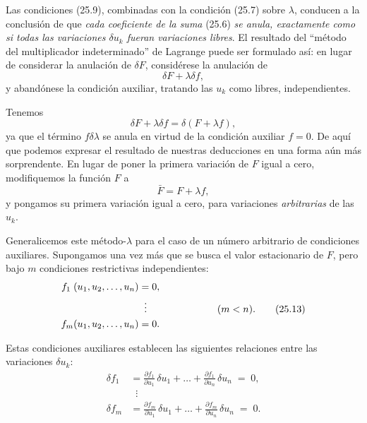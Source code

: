 \documentclass[12pt,a4paper]{book}
\begin{document}
Las condiciones (25.9), combinadas con la condición (25.7) sobre $\lambda$, conducen a la conclusión de que \textit{cada coeficiente de la suma} (25.6) \textit{se anula, exactamente como si todas las variaciones $\delta u_k$ fueran variaciones libres}. El resultado del ``método del multiplicador indeterminado'' de Lagrange puede ser formulado así: en lugar de considerar la anulación de $\delta F$, considérese la anulación de
\begin{equation}
\delta F + \lambda \delta f, \tag{25.10}
\end{equation}
y abandónese la condición auxiliar, tratando las $u_k$ como libres, independientes.

Tenemos
\begin{equation}
\delta F + \lambda \delta f = \delta(F + \lambda f), \tag{25.11}
\end{equation}
ya que el término $f\delta\lambda$ se anula en virtud de la condición auxiliar $f = 0$. De aquí que podemos expresar el resultado de nuestras deducciones en una forma aún más sorprendente. En lugar de poner la primera variación de $F$ igual a cero, modifiquemos la función $F$ a
\begin{equation}
\bar{F} = F + \lambda f, \tag{25.12}
\end{equation}
y pongamos su primera variación igual a cero, para variaciones \textit{arbitrarias} de las $u_k$.

Generalicemos este método-$\lambda$ para el caso de un número arbitrario de condiciones auxiliares. Supongamos una vez más que se busca el valor estacionario de $F$, pero bajo $m$ condiciones restrictivas independientes:
\begin{equation}
\begin{aligned}
f_1 \; (u_1, u_2, \ldots, u_n) &= 0, \\
&\;\;\vdots \hspace{2.5cm} (m < n). \tag{25.13} \\
f_m(u_1, u_2, \ldots, u_n) &= 0.
\end{aligned}
\end{equation}

Estas condiciones auxiliares establecen las siguientes relaciones entre las variaciones $\delta u_k$:
\begin{equation}
\begin{aligned}
\delta f_1 &= \frac{\partial f_1}{\partial u_1} \, \delta u_1 + \ldots + \frac{\partial f_1}{\partial u_n} \, \delta u_n \;=\; 0, \\
&\;\;\vdots \hspace{4cm} \tag{25.14} \\
\delta f_m &= \frac{\partial f_m}{\partial u_1} \, \delta u_1 + \ldots + \frac{\partial f_m}{\partial u_n} \, \delta u_n \;=\; 0.
\end{aligned}
\end{equation}
\end{document}
